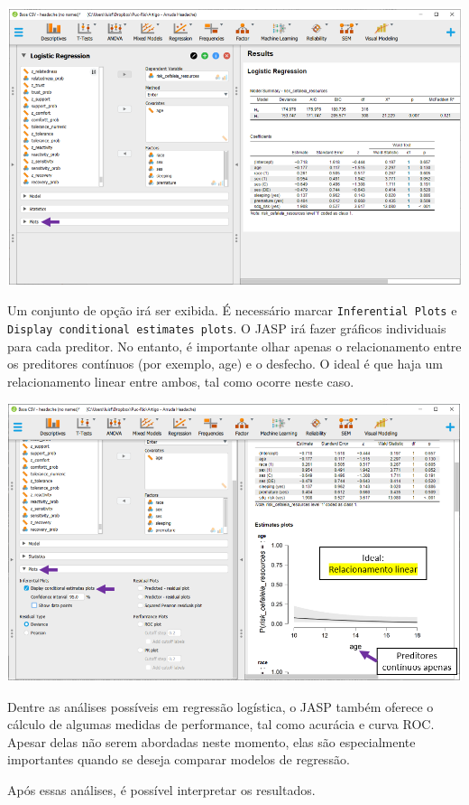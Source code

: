 \documentclass[
]{book}
\begin{document}
\includegraphics{./img/cap_logistica_assumptions_plot.png}

Um conjunto de opção irá ser exibida. É necessário marcar
\texttt{Inferential\ Plots} e
\texttt{Display\ conditional\ estimates\ plots}. O JASP irá fazer
gráficos individuais para cada preditor. No entanto, é importante olhar
apenas o relacionamento entre os preditores contínuos (por exemplo, age)
e o desfecho. O ideal é que haja um relacionamento linear entre ambos,
tal como ocorre neste caso.

\includegraphics{./img/cap_logistica_assumptions_plot2.png}

Dentre as análises possíveis em regressão logística, o JASP também
oferece o cálculo de algumas medidas de performance, tal como acurácia e
curva ROC. Apesar delas não serem abordadas neste momento, elas são
especialmente importantes quando se deseja comparar modelos de
regressão.

Após essas análises, é possível interpretar os resultados.
\end{document}
